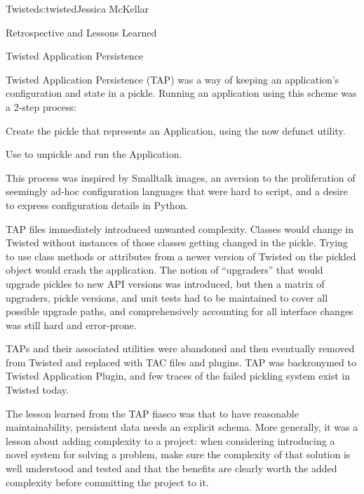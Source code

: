 \begin{aosachapter}{Twisted}{s:twisted}{Jessica McKellar}
\begin{aosasect1}{Retrospective and Lessons Learned}
\begin{aosasect2}{Twisted Application Persistence}

Twisted Application Persistence (TAP) was a way of keeping an application's
configuration and state in a pickle. Running an application using this scheme
was a 2-step process:

\begin{aosaenumerate}

\item Create the pickle that represents an Application, using the now
  defunct  utility.

\item Use  to unpickle and run the Application.

\end{aosaenumerate}

This process was inspired by Smalltalk images, an aversion to the
proliferation of seemingly ad-hoc configuration languages that were hard to
script, and a desire to express configuration details in Python.

TAP files immediately introduced unwanted complexity. Classes would change in
Twisted without instances of those classes getting changed in the pickle. Trying
to use class methods or attributes from a newer version of Twisted on the
pickled object would crash the application. The notion of ``upgraders'' that would
upgrade pickles to new API versions was introduced, but then a matrix of
upgraders, pickle versions, and unit tests had to be maintained to cover all
possible upgrade paths, and comprehensively accounting for all interface changes
was still hard and error-prone.

TAPs and their associated utilities were abandoned and then eventually
removed from Twisted and replaced with TAC files and plugins. TAP was
backronymed to Twisted Application Plugin, and few traces of the failed pickling
system exist in Twisted today.

The lesson learned from the TAP fiasco was that to have reasonable
maintainability, persistent data needs an explicit schema. More generally, it
was a lesson about adding complexity to a project: when considering introducing
a novel system for solving a problem, make sure the complexity of that solution
is well understood and tested and that the benefits are clearly worth the added
complexity before committing the project to it.

\end{aosasect2}


\end{aosasect1}
\end{aosachapter}
